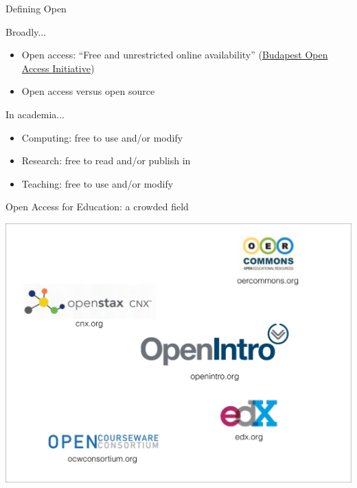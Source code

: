 \begin{frame}{Defining Open}

\begin{block}{Broadly...}
\begin{itemize}
        \item Open access: ``Free and unrestricted online availability'' (\href{http://www.budapestopenaccessinitiative.org/read}{Budapest Open Access Initiative})
        \item Open access versus open source
\end{itemize}
\end{block}

\begin{block}{In academia...}
\begin{itemize}
        \item Computing: free to use and/or modify
        \item Research: free to read and/or publish in
        \item Teaching: free to use and/or modify
\end{itemize}
\end{block}

\end{frame}


\begin{frame}{Open Access for Education: a crowded field}

\includegraphics[width=\linewidth]{openEdLogos}

\end{frame}

